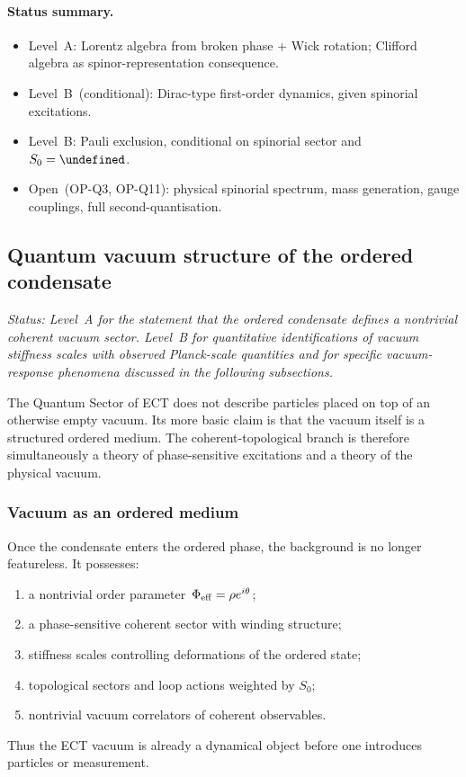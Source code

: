 \documentclass[11pt,a4paper]{article}
\let\hbar\undefined
\numberwithin{equation}{section}
\begin{document}
\paragraph{Status summary.}
\begin{itemize}
  \item Level~A: Lorentz algebra from broken phase + Wick rotation;
    Clifford algebra as spinor-representation consequence.
  \item Level~B~(conditional): Dirac-type first-order dynamics,
    given spinorial excitations.
  \item Level~B: Pauli exclusion, conditional on spinorial sector
    and $S_0=\hbar$.
  \item Open~(OP-Q3, OP-Q11): physical spinorial spectrum,
    mass generation, gauge couplings, full second-quantisation.
\end{itemize}

\subsection{Quantum vacuum structure of the ordered condensate}
\label{sec:qs_vacuum_intro}
\label{sec:quantum_vacuum}
\label{sec:unified_correlator}

\textit{Status: Level~A for the statement that the ordered condensate
defines a nontrivial coherent vacuum sector.
Level~B for quantitative identifications of vacuum stiffness scales
with observed Planck-scale quantities and for specific vacuum-response
phenomena discussed in the following subsections.}

\medskip
The Quantum Sector of ECT does not describe particles placed on top of
an otherwise empty vacuum.
Its more basic claim is that the vacuum itself is a structured ordered
medium.
The coherent-topological branch is therefore simultaneously a theory of
phase-sensitive excitations and a theory of the physical vacuum.

\subsubsection*{Vacuum as an ordered medium}

Once the condensate enters the ordered phase, the background is no
longer featureless.
It possesses:
\begin{enumerate}[label=(\roman*)]
  \item a nontrivial order parameter~$\Phi_{\rm eff}=\rho e^{i\theta}$;
  \item a phase-sensitive coherent sector with winding structure;
  \item stiffness scales controlling deformations of the ordered state;
  \item topological sectors and loop actions weighted by $S_0$;
  \item nontrivial vacuum correlators of coherent observables.
\end{enumerate}
Thus the ECT vacuum is already a dynamical object before one introduces
particles or measurement.
\end{document}
